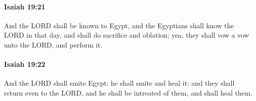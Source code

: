 		\paragraph{Isaiah 19:21} %
			\label{ISAIAH-19-21}

			And the LORD shall be known to Egypt, and the Egyptians shall know the LORD in that day, and shall do sacrifice and oblation; yea, they shall vow a vow unto the LORD, and perform it.


		\paragraph{Isaiah 19:22} %
			\label{ISAIAH-19-22}

			And the LORD shall smite Egypt: he shall smite and heal it: and they shall return even to the LORD, and he shall be intreated of them, and shall heal them.


